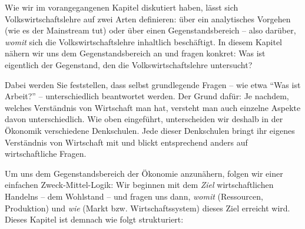 \documentclass[
  nswissgerman,
  a4paper,
  DIV=11,
  numbers=noendperiod,
  oneside,
  openany]{scrreprt}
\begin{document}
Wie wir im vorangegangenen Kapitel diskutiert haben, lässt sich
Volkswirtschaftslehre auf zwei Arten definieren: über ein analytisches
Vorgehen (wie es der Mainstream tut) oder über einen Gegenstandsbereich
-- also darüber, \emph{womit} sich die Volkswirtschaftslehre inhaltlich
beschäftigt. In diesem Kapitel nähern wir uns dem Gegenstandsbereich an
und fragen konkret: Was ist eigentlich der Gegenstand, den die
Volkswirtschaftslehre untersucht?

Dabei werden Sie feststellen, dass selbst grundlegende Fragen -- wie
etwa ``Was ist Arbeit?'' -- unterschiedlich beantwortet werden. Der
Grund dafür: Je nachdem, welches Verständnis von Wirtschaft man hat,
versteht man auch einzelne Aspekte davon unterschiedlich. Wie oben
eingeführt, unterscheiden wir deshalb in der Ökonomik verschiedene
Denkschulen. Jede dieser Denkschulen bringt ihr eigenes Verständnis von
Wirtschaft mit und blickt entsprechend anders auf wirtschaftliche
Fragen.

Um uns dem Gegenstandsbereich der Ökonomie anzunähern, folgen wir einer
einfachen Zweck-Mittel-Logik: Wir beginnen mit dem \emph{Ziel}
wirtschaftlichen Handelns -- dem Wohlstand -- und fragen uns dann,
\emph{womit} (Ressourcen, Produktion) und \emph{wie} (Markt bzw.
Wirtschaftssystem) dieses Ziel erreicht wird. Dieses Kapitel ist demnach
wie folgt strukturiert:
\end{document}
